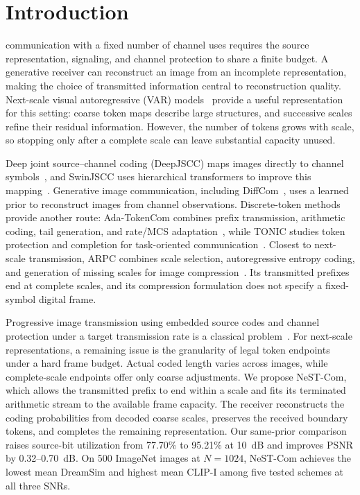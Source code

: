 \section{Introduction}
 communication with a fixed number of channel uses requires the source representation, signaling, and channel protection to share a finite budget. A generative receiver can reconstruct an image from an incomplete representation, making the choice of transmitted information central to reconstruction quality. Next-scale visual autoregressive (VAR) models~\cite{var} provide a useful representation for this setting: coarse token maps describe large structures, and successive scales refine their residual information. However, the number of tokens grows with scale, so stopping only after a complete scale can leave substantial capacity unused.

Deep joint source--channel coding (DeepJSCC) maps images directly to channel symbols~\cite{deepjscc}, and SwinJSCC uses hierarchical transformers to improve this mapping~\cite{swinjscc}. Generative image communication, including DiffCom~\cite{diffcom}, uses a learned prior to reconstruct images from channel observations. Discrete-token methods provide another route: Ada-TokenCom combines prefix transmission, arithmetic coding, tail generation, and rate/MCS adaptation~\cite{adatokencom}, while TONIC studies token protection and completion for task-oriented communication~\cite{tonic}. Closest to next-scale transmission, ARPC combines scale selection, autoregressive entropy coding, and generation of missing scales for image compression~\cite{arpc}. Its transmitted prefixes end at complete scales, and its compression formulation does not specify a fixed-symbol digital frame.

Progressive image transmission using embedded source codes and channel protection under a target transmission rate is a classical problem~\cite{chande}. For next-scale representations, a remaining issue is the granularity of legal token endpoints under a hard frame budget. Actual coded length varies across images, while complete-scale endpoints offer only coarse adjustments. We propose NeST-Com, which allows the transmitted prefix to end within a scale and fits its terminated arithmetic stream to the available frame capacity. The receiver reconstructs the coding probabilities from decoded coarse scales, preserves the received boundary tokens, and completes the remaining representation. Our same-prior comparison raises source-bit utilization from 77.70\% to 95.21\% at 10~dB and improves PSNR by 0.32--0.70~dB. On 500 ImageNet images at $N=1024$, NeST-Com achieves the lowest mean DreamSim and highest mean CLIP-I among five tested schemes at all three SNRs.

